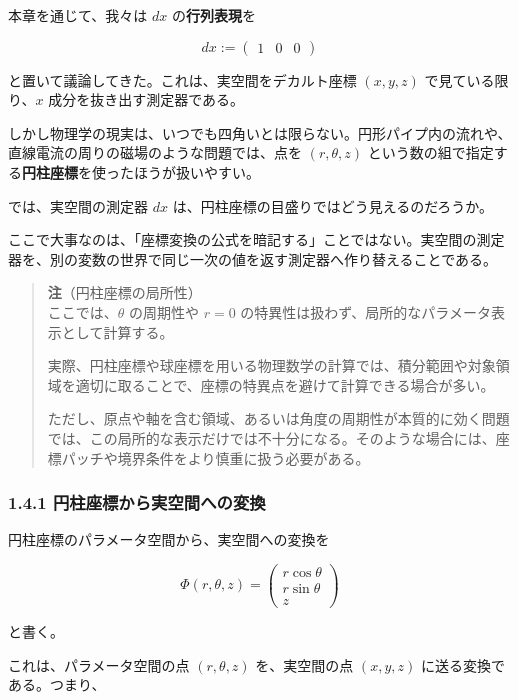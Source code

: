 \documentclass[a4paper,12pt,openany]{book}
\begin{document}
本章を通じて、我々は \(dx\) の\textbf{行列表現}を

\[
dx:=\begin{pmatrix}1&0&0\end{pmatrix}
\]

と置いて議論してきた。これは、実空間をデカルト座標 \((x,y,z)\)
で見ている限り、\(x\) 成分を抜き出す測定器である。

しかし物理学の現実は、いつでも四角いとは限らない。円形パイプ内の流れや、直線電流の周りの磁場のような問題では、点を
\((r,\theta,z)\)
という数の組で指定する\textbf{円柱座標}を使ったほうが扱いやすい。

では、実空間の測定器 \(dx\)
は、円柱座標の目盛りではどう見えるのだろうか。

ここで大事なのは、「座標変換の公式を暗記する」ことではない。実空間の測定器を、別の変数の世界で同じ一次の値を返す測定器へ作り替えることである。

\begin{quote}
\textbf{注}（円柱座標の局所性）\\
ここでは、\(\theta\) の周期性や \(r=0\)
の特異性は扱わず、局所的なパラメータ表示として計算する。

実際、円柱座標や球座標を用いる物理数学の計算では、積分範囲や対象領域を適切に取ることで、座標の特異点を避けて計算できる場合が多い。

ただし、原点や軸を含む領域、あるいは角度の周期性が本質的に効く問題では、この局所的な表示だけでは不十分になる。そのような場合には、座標パッチや境界条件をより慎重に扱う必要がある。
\end{quote}

\hypertarget{ux5186ux67f1ux5ea7ux6a19ux304bux3089ux5b9fux7a7aux9593ux3078ux306eux5909ux63db}{%
\subsubsection{1.4.1
円柱座標から実空間への変換}\label{ux5186ux67f1ux5ea7ux6a19ux304bux3089ux5b9fux7a7aux9593ux3078ux306eux5909ux63db}}

円柱座標のパラメータ空間から、実空間への変換を

\[
\Phi(r,\theta,z)
=
\begin{pmatrix}
r\cos\theta\\
r\sin\theta\\
z
\end{pmatrix}
\]

と書く。

これは、パラメータ空間の点 \((r,\theta,z)\) を、実空間の点 \((x,y,z)\)
に送る変換である。つまり、
\end{document}
